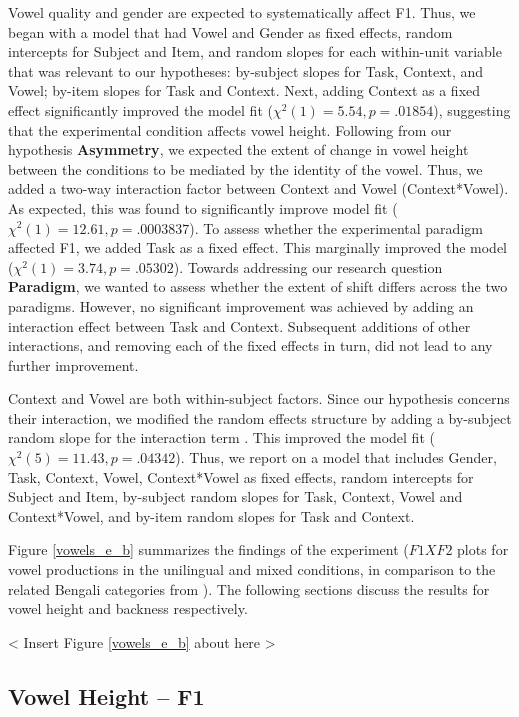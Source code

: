 \documentclass[12 pt]{article}
\begin{document}
Vowel quality and gender are expected to systematically affect F1. Thus, we began with a model that had Vowel and Gender as fixed effects, random intercepts for Subject and Item, and random slopes for each within-unit variable that was relevant to our hypotheses: by-subject slopes for Task, Context, and Vowel; by-item slopes for Task and Context. Next, adding Context as a fixed effect significantly improved the model fit ($\chi^2(1) = 5.54, p= .01854$), suggesting that the experimental condition affects vowel height. Following from our hypothesis \textbf{Asymmetry}, we expected the extent of change in vowel height between the conditions to be mediated by the identity of the vowel. Thus, we added a two-way interaction factor between Context and Vowel (Context*Vowel). As expected, this was found to significantly improve model fit ($\chi^2(1) = 12.61, p= .0003837$). To assess whether the experimental paradigm affected F1, we added Task as a fixed effect. This marginally improved the model ($\chi^2(1) = 3.74, p= .05302$). Towards addressing our research question \textbf{Paradigm}, we wanted to assess whether the extent of shift differs across the two paradigms. However, no significant improvement was achieved by adding an interaction effect between Task and Context. Subsequent additions of other interactions, and removing each of the fixed effects in turn, did not lead to any further improvement. 

Context and Vowel are both within-subject factors. Since our hypothesis concerns their interaction, we modified the random effects structure by adding a by-subject random slope for the interaction term \citep{brauer2018linear}. This improved the model fit ($\chi^2(5) = 11.43, p = .04342$). Thus, we report on a model that includes Gender, Task, Context, Vowel, Context*Vowel as fixed effects, random intercepts for Subject and Item, by-subject random slopes for Task, Context, Vowel and Context*Vowel, and by-item random slopes for Task and Context.

Figure \ref{vowels_e_b} summarizes the findings of the experiment ($F1XF2$ plots for vowel productions in the unilingual and mixed conditions, in comparison to the related Bengali categories from \cite{dutta2021}). The following sections discuss the results for vowel height and backness respectively.

< Insert Figure \ref{vowels_e_b} about here >

\subsection{Vowel Height -- F1}
\end{document}

